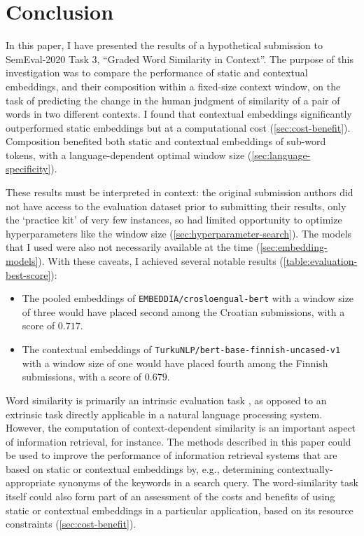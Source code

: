 \section{Conclusion}
\label{sec:conclusion}

In this paper, I have presented the results of a hypothetical submission to
SemEval-2020 Task 3, ``Graded Word Similarity in Context''.
The purpose of this investigation was to compare the performance of static and
contextual embeddings, and their composition within a fixed-size context window, on the
task of predicting the change in the human judgment of similarity of a pair of words in
two different contexts.
I found that contextual embeddings significantly outperformed static embeddings but at
a computational cost (\cref{sec:cost-benefit}).
Composition benefited both static and contextual embeddings of sub-word tokens, with a
language-dependent optimal window size (\cref{sec:language-specificity}).

These results must be interpreted in context: the original submission authors did not
have access to the evaluation dataset prior to submitting their results, only the
`practice kit' of very few instances, so had limited opportunity to optimize
hyperparameters like the window size (\cref{sec:hyperparameter-search}).
The models that I used were also not necessarily available at the time
(\cref{sec:embedding-models}).
With these caveats, I achieved several notable results (\cref{table:evaluation-best-score}):
\begin{itemize}
  \item The pooled embeddings of \texttt{EMBEDDIA/crosloengual-bert} with a window
        size of three would have placed second among the Croatian submissions, with a
        score of $0.717$.
  \item The contextual embeddings of \texttt{TurkuNLP/bert-base-finnish-uncased-v1}
        with a window size of one would have placed fourth among the Finnish
        submissions, with a score of $0.679$.
\end{itemize}

Word similarity is primarily an intrinsic evaluation task \parencite[1281]{Lenci2022},
as opposed to an extrinsic task directly applicable in a natural language processing
system.
However, the computation of context-dependent similarity is an important aspect of
information retrieval, for instance.
The methods described in this paper could be used to improve the performance of
information retrieval systems that are based on static or contextual embeddings by,
e.g., determining contextually-appropriate synonyms of the keywords in a search query.
The word-similarity task itself could also form part of an assessment of the costs and
benefits of using static or contextual embeddings in a particular application, based on
its resource constraints (\cref{sec:cost-benefit}).
